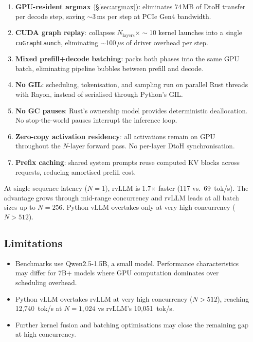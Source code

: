 \begin{enumerate}
  \item \textbf{GPU-resident argmax} (\S\ref{sec:argmax}): eliminates 74\,MB of
        DtoH transfer per decode step, saving $\sim$3\,ms per step at PCIe Gen4
        bandwidth.
  \item \textbf{CUDA graph replay}: collapses $N_{\text{layers}} \times \sim$10
        kernel launches into a single \texttt{cuGraphLaunch}, eliminating
        $\sim$100\,$\mu$s of driver overhead per step.
  \item \textbf{Mixed prefill+decode batching}: packs both phases into the same GPU
        batch, eliminating pipeline bubbles between prefill and decode.
  \item \textbf{No GIL}: scheduling, tokenisation, and sampling run on parallel Rust
        threads with Rayon, instead of serialised through Python's GIL.
  \item \textbf{No GC pauses}: Rust's ownership model provides deterministic
        deallocation. No stop-the-world pauses interrupt the inference loop.
  \item \textbf{Zero-copy activation residency}: all activations remain on GPU
        throughout the $N$-layer forward pass. No per-layer DtoH synchronisation.
  \item \textbf{Prefix caching}: shared system prompts reuse computed KV blocks
        across requests, reducing amortised prefill cost.
\end{enumerate}

At single-sequence latency ($N\!=\!1$), rvLLM is 1.7$\times$ faster (117 vs.\ 69~tok/s).
The advantage grows through mid-range concurrency and rvLLM leads at all batch sizes up
to $N\!=\!256$. Python vLLM overtakes only at very high concurrency ($N\!>\!512$).

\subsection{Limitations}

\begin{itemize}
  \item Benchmarks use Qwen2.5-1.5B, a small model. Performance characteristics
        may differ for 7B+ models where GPU computation dominates over scheduling
        overhead.
  \item Python vLLM overtakes rvLLM at very high concurrency ($N\!>\!512$), reaching
        12{,}740~tok/s at $N\!=\!1{,}024$ vs rvLLM's 10{,}051~tok/s.
  \item Further kernel fusion and batching optimisations may close the remaining gap
        at high concurrency.
\end{itemize}

